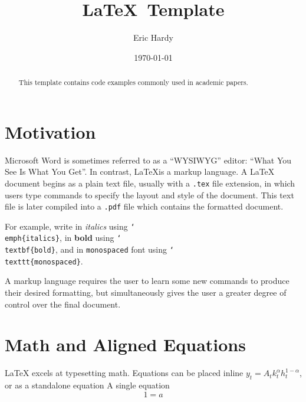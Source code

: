 \documentclass[12pt]{article}
\begin{document}
\title{\vspace{-.5in}\LaTeX\ Template}
\date{\today}
\author{Eric Hardy}
\maketitle
\begin{abstract}
	This template contains code examples commonly used in academic papers.  
\end{abstract}

\section{Motivation}\label{sec:motivation}
Microsoft Word is sometimes referred to as a ``WYSIWYG'' editor: ``What You See Is What You Get''. In contrast, \LaTeX is a markup language.  A LaTeX document begins as a plain text file, usually with a \texttt{.tex} file extension, in which users type commands to specify the layout and style of the document.  This text file is later compiled into a \texttt{.pdf} file which contains the formatted document.  

For example, write in \emph{italics} using \texttt{\char`\\ emph\{italics\}}, in \textbf{bold} using \texttt{\char`\\ textbf\{bold\}}, and in \texttt{monospaced} font using \texttt{\char`\\ texttt\{monospaced\}}.  

A markup language requires the user to learn some new commands to produce their desired formatting, but simultaneously gives the user a greater degree of control over the final document.  


\section{Math and Aligned Equations}\label{sec:math}
LaTeX excels at typesetting math.  Equations can be placed inline $y_t = A_tk_t^\alpha h_t^{1-\alpha}$, or as a standalone equation
A single equation 
\begin{equation}\label{eq:singleeqn}
	1 = a
\end{equation}
\end{document}
